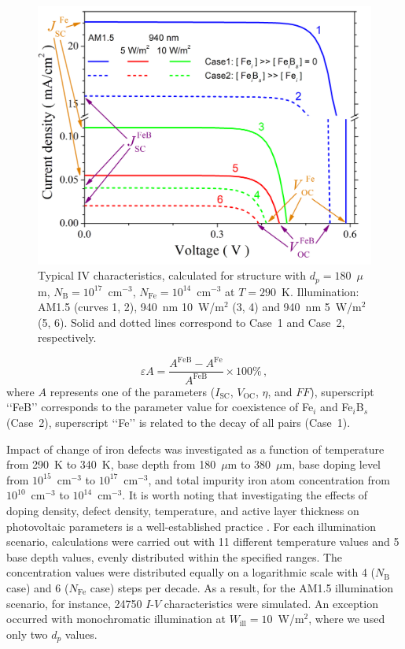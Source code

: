\documentclass[a4paper,fleqn]{cas-sc}
\begin{document}
\begin{figure}
	\centering
		\includegraphics[width=0.5\linewidth]{Figure2.png}
	  \caption{Typical IV characteristics,
   calculated for structure with $d_p = 180$~$\mu$m, $N_\mathrm{B}=10^{17}$~cm$^{-3}$,
   $N_\mathrm{Fe}=10^{14}$~cm$^{-3}$ at $T = 290$~K.
   Illumination: AM1.5 (curves 1, 2), 940~nm 10~W/m$^{2}$ (3, 4) and 940~nm 5~W/m$^{2}$ (5, 6).
   Solid and dotted lines correspond to Case~1 and Case~2, respectively.}\label{fig2}
\end{figure}


\begin{equation}
\label{eq1}
    \varepsilon A = \frac{A^\mathrm{FeB} - A^\mathrm{Fe}}{A^\mathrm{FeB}} \times 100 \%\,,
\end{equation}
where $A$ represents one of the parameters ($I_\mathrm{SC}$, $V_\mathrm{OC}$, $\eta$, and $F\!F$),
superscript ‘‘FeB’’ corresponds to the parameter value for coexistence of Fe$_i$ and Fe$_i$B$_s$ (Case~2),
superscript ‘‘Fe’’ is related to the decay of all pairs (Case~1).


Impact of change of iron defects was investigated as a function of temperature from 290~K to 340~K,
base depth from 180~$\mu$m to 380~$\mu$m,
base doping level from $10^{15}$~cm$^{-3}$ to $10^{17}$~cm$^{-3}$,
and total impurity iron atom concentration from $10^{10}$~cm$^{-3}$ to $10^{14}$~cm$^{-3}$.
It is worth noting that investigating the effects of doping density, defect density, temperature, and active layer thickness on photovoltaic parameters is a well-established practice \cite{MasumMia2025,Rahman2024,Sultana2024}.
For each illumination scenario, calculations were carried out with 11 different temperature values and 5 base depth values,
evenly distributed within the specified ranges.
The concentration values were distributed equally on a logarithmic scale with 4 ($N_\mathrm{B}$ case) and 6 ($N_\mathrm{Fe}$ case) steps per decade.
As a result, for the AM1.5 illumination scenario, for instance, 24750 $I$-$V$ characteristics were simulated.
An exception occurred with monochromatic illumination at $W_\mathrm{ill} = 10$~W/m$^{2}$,
where we used only two $d_p$ values.
\end{document}
